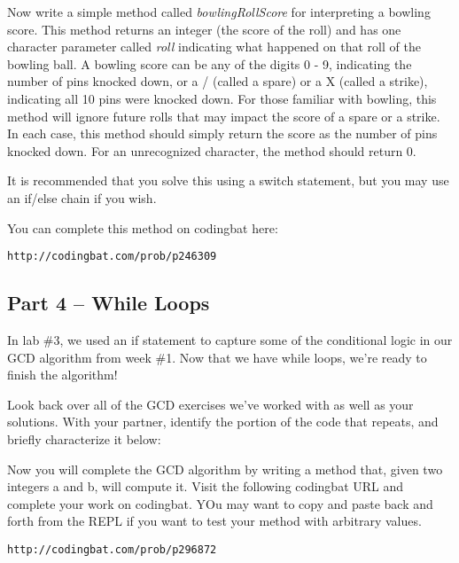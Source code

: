 \begin{exer}

Now write a simple method called \textit{bowlingRollScore} for interpreting a bowling score. This method returns an integer (the score of the roll) and has one character parameter called \textit{roll} indicating what happened on that roll of the bowling ball.  A bowling score can be any of the digits 0 - 9, indicating the number of pins knocked down, or a / (called a spare) or a X (called a strike), indicating all 10 pins were knocked down. For those familiar with bowling, this method will ignore future rolls that may impact the score of a spare or a strike. In each case, this method should simply return the score as the number of pins knocked down. For an unrecognized character, the method should return 0.

It is recommended that you solve this using a switch statement, but you may use an if/else chain if you wish. 

You can complete this method on codingbat here:


\begin{verbatim}
http://codingbat.com/prob/p246309
\end{verbatim}

\end{exer}

\initialbox


\subsection{Part 4 -- While Loops}

In lab \#3, we used an if statement to capture some of the conditional logic in our GCD algorithm from week \#1. Now that we have while loops, we're ready to finish the algorithm!

\begin{exer}
Look back over all of the GCD exercises we've worked with as well as your solutions. With your partner, identify the portion of the code that repeats, and briefly characterize it below:

\evallinethree
\end{exer}

\begin{exer}
Now you will complete the GCD algorithm by writing a method that, given two integers a and b, will compute it. Visit the following codingbat URL and complete your work on codingbat. YOu may want to copy and paste back and forth from the REPL if you want to test your method with arbitrary values. 

\begin{verbatim}
http://codingbat.com/prob/p296872
\end{verbatim}

\end{exer}

\initialbox

